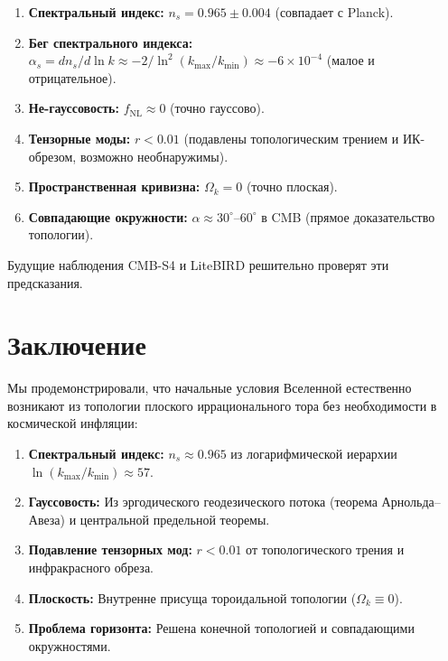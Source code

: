 \documentclass[12pt,a4paper]{article}
\begin{document}
\begin{enumerate}
    \item \textbf{Спектральный индекс:} $n_s = 0.965 \pm 0.004$ (совпадает с Planck).
    
    \item \textbf{Бег спектрального индекса:} $\alpha_s = dn_s/d\ln k \approx -2/\ln^2(k_{\max}/k_{\min}) \approx -6 \times 10^{-4}$ (малое и отрицательное).
    
    \item \textbf{Не-гауссовость:} $f_{\mathrm{NL}} \approx 0$ (точно гауссово).
    
    \item \textbf{Тензорные моды:} $r < 0.01$ (подавлены топологическим трением и ИК-обрезом, возможно необнаружимы).
    
    \item \textbf{Пространственная кривизна:} $\Omega_k = 0$ (точно плоская).
    
    \item \textbf{Совпадающие окружности:} $\alpha \approx 30^\circ\text{--}60^\circ$ в CMB (прямое доказательство топологии).
\end{enumerate}

Будущие наблюдения CMB-S4 и LiteBIRD решительно проверят эти предсказания.

\section{Заключение}

Мы продемонстрировали, что начальные условия Вселенной естественно возникают из топологии плоского иррационального тора без необходимости в космической инфляции:

\begin{enumerate}
    \item \textbf{Спектральный индекс:} $n_s \approx 0.965$ из логарифмической иерархии $\ln(k_{\max}/k_{\min}) \approx 57$.
    
    \item \textbf{Гауссовость:} Из эргодического геодезического потока (теорема Арнольда–Авеза) и центральной предельной теоремы.
    
    \item \textbf{Подавление тензорных мод:} $r < 0.01$ от топологического трения и инфракрасного обреза.
    
    \item \textbf{Плоскость:} Внутренне присуща тороидальной топологии ($\Omega_k \equiv 0$).
    
    \item \textbf{Проблема горизонта:} Решена конечной топологией и совпадающими окружностями.
\end{enumerate}
\end{document}
